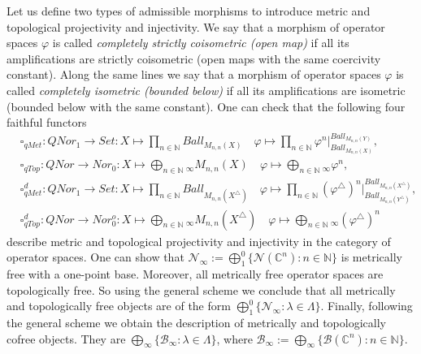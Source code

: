 \documentclass[a0b,landscape]{a0poster}
\begin{document}
\begin{multicols}{4}
Let us define two types of admissible morphisms to introduce metric and topological projectivity and injectivity. We say that a morphism of operator spaces $\varphi$
is called \textit{completely strictly coisometric (open map)} if all its amplifications are strictly coisometric (open maps with the same coercivity constant). Along the same lines 
we say that a morphism of operator spaces $\varphi$ is called \textit{completely isometric (bounded below)} if all its amplifications are isometric (bounded below with the same
constant). One can check that the following four faithful functors
$$
\begin{aligned}
&\square_{qMet} : QNor_1 \to Set :  X\mapsto\prod_{n \in \mathbb{N}} Ball_{M_{n,n}(X)}\quad
\varphi\mapsto \prod_{n\in\mathbb{N}} \varphi^{n}|_{Ball_{M_{n,n}(X)}}^{Ball_{M_{n,n}(Y)}},\\
&\square_{qTop} : QNor \to Nor_0:  X \mapsto \bigoplus_{ n \in \mathbb{N}}{}_\infty M_{n,n}(X) \quad
\varphi\mapsto\bigoplus_{n\in\mathbb{N}}{}_\infty \varphi^{n},\\
&\square_{qMet}^d : QNor_1 \to Set : X\mapsto\prod_{n \in \mathbb{N}} Ball_{M_{n,n}(X^\triangle)}\quad
\varphi\mapsto \prod_{n\in\mathbb{N}} (\varphi^\triangle)^{n}|_{Ball_{M_{n,n}(Y^\triangle)}}^{Ball_{M_{n,n}(X^\triangle)}},\\
&\square_{qTop}^d : QNor \to Nor_0^o: X \mapsto \bigoplus_{ n \in \mathbb{N}}{}_\infty M_{n,n}(X^\triangle) \quad
\varphi\mapsto\bigoplus_{n\in\mathbb{N}}{}_\infty(\varphi^\triangle)^{n}
\end{aligned}
$$
describe metric and topological projectivity and injectivity in the category of operator spaces. One can show that
$\mathcal{N}_{\infty} := \bigoplus_1^0 \{\mathcal{N}(\mathbb{C}^n): n \in \mathbb{N}\}$ is metrically free with a one-point base. Moreover, all metrically free operator spaces 
are topologically free. So using the general scheme we conclude that all metrically and topologically free objects are of the form 
$\bigoplus_1^0\{\mathcal{N}_\infty: \lambda \in \Lambda\}$. 
Finally, following the general scheme we obtain the description of metrically and topologically cofree objects. They are
$\bigoplus_\infty\{\mathcal{B}_\infty: \lambda \in \Lambda\}$, where
$\mathcal{B}_{\infty} := \bigoplus_\infty \{\mathcal{B}(\mathbb{C}^n): n \in \mathbb{N}\}$.










\end{multicols}
\end{document}
